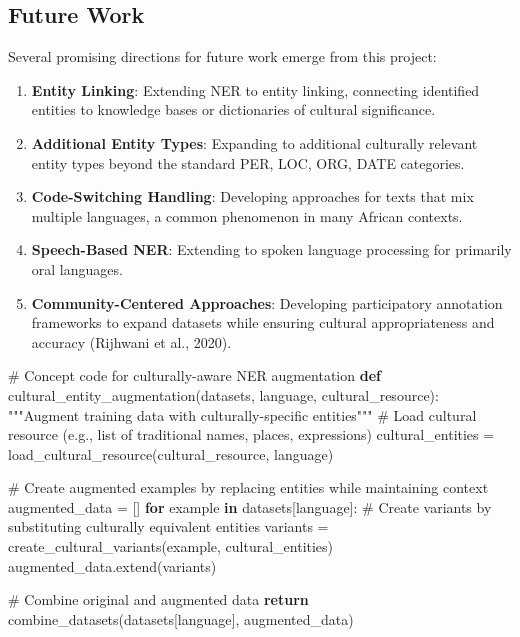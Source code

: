 \documentclass[
]{article}
\newenvironment{Shaded}{\begin{snugshade}}{\end{snugshade}}
\newcommand{\CommentTok}[1]{\textcolor[rgb]{0.37,0.37,0.37}{#1}}
\newcommand{\ControlFlowTok}[1]{\textcolor[rgb]{0.00,0.23,0.31}{\textbf{#1}}}
\newcommand{\KeywordTok}[1]{\textcolor[rgb]{0.00,0.23,0.31}{\textbf{#1}}}
\newcommand{\NormalTok}[1]{\textcolor[rgb]{0.00,0.23,0.31}{#1}}
\newcommand{\OperatorTok}[1]{\textcolor[rgb]{0.37,0.37,0.37}{#1}}
\begin{document}
\subsection{Future Work}\label{future-work}

Several promising directions for future work emerge from this project:

\begin{enumerate}
\def\labelenumi{\arabic{enumi}.}
\item
  \textbf{Entity Linking}: Extending NER to entity linking, connecting
  identified entities to knowledge bases or dictionaries of cultural
  significance.
\item
  \textbf{Additional Entity Types}: Expanding to additional culturally
  relevant entity types beyond the standard PER, LOC, ORG, DATE
  categories.
\item
  \textbf{Code-Switching Handling}: Developing approaches for texts that
  mix multiple languages, a common phenomenon in many African contexts.
\item
  \textbf{Speech-Based NER}: Extending to spoken language processing for
  primarily oral languages.
\item
  \textbf{Community-Centered Approaches}: Developing participatory
  annotation frameworks to expand datasets while ensuring cultural
  appropriateness and accuracy (Rijhwani et al., 2020).
\end{enumerate}

\begin{Shaded}
\begin{Highlighting}[]
\CommentTok{\# Concept code for culturally{-}aware NER augmentation}
\KeywordTok{def}\NormalTok{ cultural\_entity\_augmentation(datasets, language, cultural\_resource):}
    \CommentTok{"""Augment training data with culturally{-}specific entities"""}
    \CommentTok{\# Load cultural resource (e.g., list of traditional names, places, expressions)}
\NormalTok{    cultural\_entities }\OperatorTok{=}\NormalTok{ load\_cultural\_resource(cultural\_resource, language)}
    
    \CommentTok{\# Create augmented examples by replacing entities while maintaining context}
\NormalTok{    augmented\_data }\OperatorTok{=}\NormalTok{ []}
    \ControlFlowTok{for}\NormalTok{ example }\KeywordTok{in}\NormalTok{ datasets[language]:}
        \CommentTok{\# Create variants by substituting culturally equivalent entities}
\NormalTok{        variants }\OperatorTok{=}\NormalTok{ create\_cultural\_variants(example, cultural\_entities)}
\NormalTok{        augmented\_data.extend(variants)}
    
    \CommentTok{\# Combine original and augmented data}
    \ControlFlowTok{return}\NormalTok{ combine\_datasets(datasets[language], augmented\_data)}
\end{Highlighting}
\end{Shaded}
\end{document}
